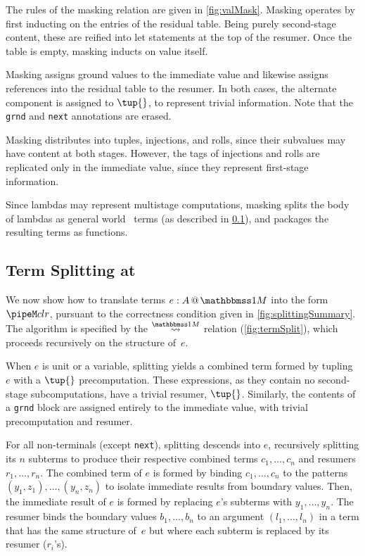 \begin{abstrsyn}
The rules of the masking relation are given in \ref{fig:valMask}.
Masking operates by first inducting on the entries of the residual table.  
Being purely second-stage content, these are reified into let statements at the top of the resumer.
Once the table is empty, masking inducts on value itself.

Masking assigns ground values to the immediate value
and likewise assigns references into the residual table to the resumer.
In both cases, the alternate component is assigned to $\tup{}$, to represent trivial information.
Note that the \texttt{grnd} and \texttt{next} annotations are erased.

Masking distributes into tuples, injections, and rolls, since their subvalues may have content at both stages.
However, the tags of injections and rolls are replicated only in the immediate value, 
since they represent first-stage information.

Since lambdas may represent multistage computations, 
masking splits the body of lambdas as general world \bbonem\ terms (as described in \ref{sec:split-one}), 
and packages the resulting terms as functions.

\subsection{Term Splitting at \bbonem}
\label{sec:split-one}

We now show how to translate terms $\colmix e A$ into the form $\pipeM c l r$,
pursuant to the correctness condition given in \ref{fig:splittingSummary}.
The algorithm is specified by the $\splitonesym$ relation (\cref{fig:termSplit}), 
which proceeds recursively on the structure of~$e$.

When $e$ is unit or a variable,
splitting yields a combined term formed by tupling $e$ with a $\tup{}$ precomputation.
These expressions, as they contain no second-stage subcomputations, have a trivial resumer, $\tup{}$.
Similarly, the contents of a \texttt{grnd} block are assigned entirely to the immediate value,
with trivial precomputation and resumer.

For all non-terminals (except \texttt{next}),
splitting descends into $e$, recursively splitting its $n$ subterms
to produce their respective combined terms $c_1,\ldots,c_n$ and resumers $r_1, \ldots, r_n$.
The combined term of $e$ is formed by binding $c_1,\ldots,c_n$
to the patterns $(y_1,z_1),\ldots,(y_n,z_n)$
to isolate immediate results from boundary values. Then,
the immediate result of $e$ is formed by replacing $e$'s subterms with $y_1,\ldots,y_n$.
The resumer binds the boundary values $b_1,\ldots,b_n$ to an
argument $(l_1,\ldots,l_n)$ in a term that has the same structure
of~$e$ but where each subterm is replaced by its resumer ($r_i$'s).


\end{abstrsyn}
